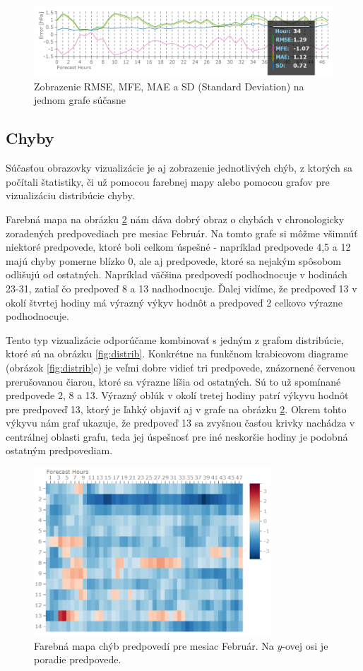 \begin{figure}
	\centering
	\includegraphics[width = 6in]{detail}
	\caption{Zobrazenie RMSE, MFE, MAE a SD (Standard Deviation) na jednom grafe súčasne}
	\label{fig:detail} 
\end{figure}


\subsection{Chyby}

Súčasťou obrazovky vizualizácie je aj zobrazenie jednotlivých chýb, z ktorých sa počítali štatistiky, či už pomocou farebnej mapy alebo pomocou grafov pre vizualizáciu distribúcie chyby.

Farebná mapa na obrázku \ref{fig:errors} nám dáva dobrý obraz o chybách v chronologicky zoradených predpovediach pre mesiac Február. Na tomto grafe si môžme všimnúť niektoré predpovede, ktoré boli celkom úspešné - napríklad predpovede 4,5 a 12 majú chyby pomerne blízko 0, ale aj predpovede, ktoré sa nejakým spôsobom odlišujú od ostatných. Napríklad väčšina predpovedí podhodnocuje v hodinách 23-31, zatiaľ čo predpoveď 8 a 13 nadhodnocuje. Ďalej vidíme, že predpoveď 13 v okolí štvrtej hodiny má výrazný výkyv hodnôt a predpoveď 2 celkovo výrazne podhodnocuje.

Tento typ vizualizácie odporúčame kombinovať s jedným z grafom distribúcie, ktoré sú na obrázku \ref{fig:distrib}. Konkrétne na funkčnom krabicovom diagrame (obrázok \ref{fig:distrib}c) je veľmi dobre vidieť tri predpovede, znázornené červenou prerušovanou čiarou, ktoré sa výrazne líšia od ostatných. Sú to už spomínané predpovede 2, 8 a 13. Výrazný oblúk v okolí tretej hodiny patrí výkyvu hodnôt pre predpoveď 13, ktorý je ľahký objaviť aj v grafe na obrázku \ref{fig:errors}. Okrem tohto výkyvu nám graf ukazuje, že predpoveď 13 sa zvyšnou časťou krivky nachádza v centrálnej oblasti grafu, teda jej úspešnosť pre iné neskoršie hodiny je podobná ostatným predpovediam.

\begin{figure}
	\centering
	\includegraphics[width = 3.5in]{errors}
	\caption{Farebná mapa chýb predpovedí pre mesiac Február. Na \mbox{$ y $-ovej} osi je poradie predpovede.}
	\label{fig:errors} 
\end{figure}

